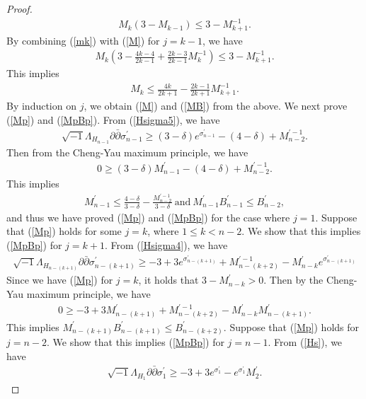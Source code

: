 \documentclass[12pt]{article}
\theoremstyle{definition}
\def\inum{{\sqrt{-1}}}
\begin{document}
\begin{proof}
\begin{align}
M_k(3-M_{k-1})\leq 3-M_{k+1}^{-1}. \label{mk}
\end{align}
By combining (\ref{mk}) with (\ref{M}) for $j=k-1$, we have
\begin{align*}
M_k\left(3-\frac{4k-4}{2k-1}+\frac{2k-3}{2k-1}M_k^{-1}\right)\leq 3-M_{k+1}^{-1}.
\end{align*}
This implies
\begin{align*}
M_k \leq \frac{4k}{2k+1}-\frac{2k-1}{2k+1}M_{k+1}^{-1}.
\end{align*} 
By induction on $j$, we obtain (\ref{M}) and (\ref{MB}) from the above. We next prove (\ref{Mp}) and (\ref{MpBp}). From (\ref{Hsigma5}), we have 
\begin{align*}
\inum \Lambda_{H_{n-1}}\partial \bar{\partial} \sigma^\prime_{n-1}\geq (3-\delta)e^{\sigma_{n-1}^\prime}-(4-\delta)+M_{n-2}^{\prime-1}. 
\end{align*}
Then from the Cheng-Yau maximum principle, we have
\begin{align*}
0\geq (3-\delta)M_{n-1}^\prime-(4-\delta)+M_{n-2}^{\prime-1}.
\end{align*}
This implies
\begin{align*}
M_{n-1}^\prime\leq \frac{4-\delta}{3-\delta}-\frac{M_{n-2}^{\prime-1}}{3-\delta} \ \text{and} \
M_{n-1}^\prime B_{n-1}^\prime\leq B_{n-2}^\prime,
\end{align*}
and thus we have proved (\ref{Mp}) and (\ref{MpBp}) for the case where $j=1$. Suppose that (\ref{Mp}) holds for some $j=k$, where $1\leq k<n-2$. We show that this implies (\ref{MpBp}) for $j=k+1$. From (\ref{Hsigma4}), we have
\begin{align*}
\inum \Lambda_{H_{n-(k+1)}}\partial \bar{\partial} \sigma^\prime_{n-(k+1)}\geq -3+3e^{\sigma_{n-(k+1)}^\prime}+M_{n-(k+2)}^{\prime-1}-M_{n-k}^\prime e^{\sigma_{n-(k+1)}^\prime}
\end{align*}
Since we have (\ref{Mp}) for $j=k$, it holds that $3-M_{n-k}^\prime>0$. Then by the Cheng-Yau maximum principle, we have
\begin{align*}
0\geq -3+3M_{n-(k+1)}^\prime+M_{n-(k+2)}^{\prime-1}-M_{n-k}^\prime M_{n-(k+1)}^\prime.
\end{align*}
This implies $M_{n-(k+1)}^\prime B_{n-(k+1)}^\prime\leq B_{n-(k+2)}^\prime$. Suppose that (\ref{Mp}) holds for $j=n-2$. We show that this implies (\ref{MpBp}) for $j=n-1$. From (\ref{Hs}), we have 
\begin{align*}
\inum \Lambda_{H_1}\partial \bar{\partial} \sigma^\prime_1\geq -3+3e^{\sigma_1^\prime}-e^{\sigma_1^\prime}M_2^\prime.

\end{align*}
\end{proof}
\end{document}

